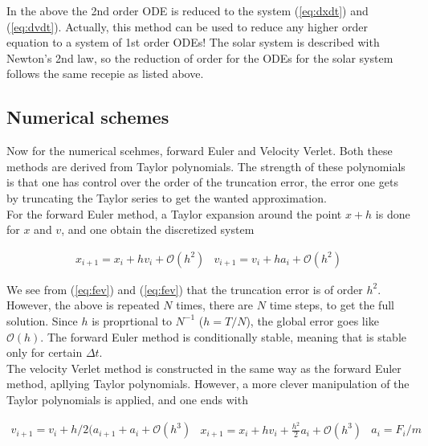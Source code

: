 \documentclass{article}
\begin{document}
In the above the 2nd order ODE is reduced to the system (\ref{eq:dxdt}) and (\ref{eq:dvdt}). Actually, this method can be used to reduce any higher order equation to a system of 1st order ODEs! The solar system is described with Newton's 2nd law, so the reduction of order for the ODEs for the solar system follows the same recepie as listed above.\\

\subsection{Numerical schemes}
Now for the numerical scehmes, forward Euler and Velocity Verlet. Both these methods are derived from Taylor polynomials. The strength of these polynomials is that one has control over the order of the truncation error, the error one gets by truncating the Taylor series to get the wanted approximation. \\

For the forward Euler method, a Taylor expansion around the point $x + h$ is done for $x$ and $v$, and one obtain the discretized system

\begin{subequations}
	\begin{align}
		x_{i+1} = x_i + hv_i + \mathcal{O}(h^2)\label{eq:fev}
	\end{align}
	
	\begin{align}
		v_{i+1} = v_i + ha_i + \mathcal{O}(h^2)\label{eq:fea}
	\end{align}
\end{subequations}

We see from (\ref{eq:fev}) and (\ref{eq:fev}) that the truncation error is of order $h^2$. However, the above is repeated $N$ times, there are $N$ time steps, to get the full solution. Since $h$ is proprtional to $N^{-1}$ ($h = T/N$), the global error goes like $\mathcal{O}(h)$. The forward Euler method is conditionally stable, meaning that is stable only for certain $\Delta t$.\\

The velocity Verlet method is constructed in the same way as the forward Euler method, apllying Taylor polynomials. However, a more clever manipulation of the Taylor polynomials is applied, and one ends with

\begin{subequations}
	\begin{align}
	v_{i+1} = v_i + h/2(a_{i+1} + a_i + \mathcal{O}(h^3)\label{eq:vvv}
	\end{align}
	
	\begin{align}
	x_{i+1} = x_i + hv_i + \frac{h^2}{2} a_i + \mathcal{O}(h^3)\label{eq:vvx}
	\end{align}
	
	\begin{align}
	a_i = F_i/m\label{eq:vva}
	\end{align}
\end{subequations}
\end{document}
